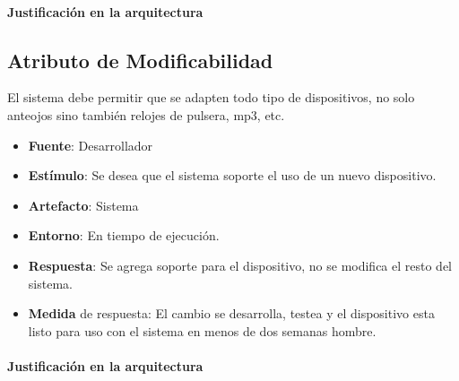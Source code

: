 \paragraph{Justificación en la arquitectura}



\subsection{Atributo de Modificabilidad}
El sistema debe permitir que se adapten todo tipo de dispositivos, no solo anteojos sino también relojes de pulsera, mp3, etc.

\begin{itemize}
  \item \textbf{Fuente}: Desarrollador
  \item \textbf{Estímulo}: Se desea que el sistema soporte el uso de un nuevo dispositivo.
  \item \textbf{Artefacto}: Sistema
  \item \textbf{Entorno}: En tiempo de ejecución.
  \item \textbf{Respuesta}: Se agrega soporte para el dispositivo, no se modifica el resto del sistema.
  \item \textbf{Medida} de respuesta: El cambio se desarrolla, testea y el dispositivo esta listo para uso con el sistema en menos de dos semanas hombre.
\end{itemize}

\paragraph{Justificación en la arquitectura}

